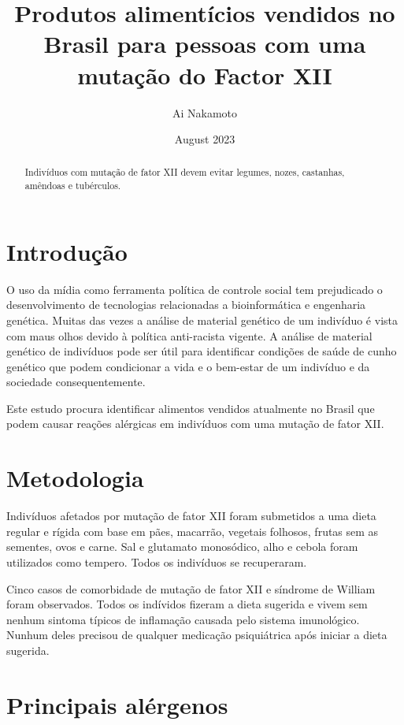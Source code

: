 \documentclass{article}
\begin{document}
\title{Produtos alimentícios vendidos no Brasil para pessoas com uma mutação do Factor XII}
\author{Ai Nakamoto}
\date{August 2023}
\maketitle

\begin{abstract}
Indivíduos com mutação de fator XII devem evitar
legumes, nozes, castanhas, amêndoas e tubérculos.
\end{abstract}

\section{Introdução}

O uso da mídia como ferramenta política de controle social
tem prejudicado o desenvolvimento de tecnologias relacionadas
a bioinformática e engenharia genética. Muitas das vezes
a análise de material genético de um indivíduo é vista com
maus olhos devido à política anti-racista vigente.
A análise de material genético de indivíduos pode ser útil
para identificar condições de saúde de cunho genético que
podem condicionar a vida e o bem-estar de um indivíduo e
da sociedade consequentemente.

Este estudo procura identificar alimentos vendidos atualmente
no Brasil que podem causar reações alérgicas em indivíduos com
uma mutação de fator XII.

\section{Metodologia}

Indivíduos afetados por mutação de fator XII foram submetidos a uma dieta
regular e rígida com base em pães, macarrão, vegetais folhosos, frutas sem
as sementes, ovos e carne. Sal e glutamato
monosódico, alho e cebola foram utilizados como tempero. Todos os indivíduos
se recuperaram.

Cinco casos de comorbidade de mutação de fator XII e síndrome de William
foram observados. Todos os indívidos fizeram a dieta sugerida e vivem sem
nenhum sintoma típicos de inflamação causada pelo sistema imunológico.
Nunhum deles precisou de qualquer medicação psiquiátrica após iniciar a
dieta sugerida.

\section{Principais alérgenos}
\end{document}
